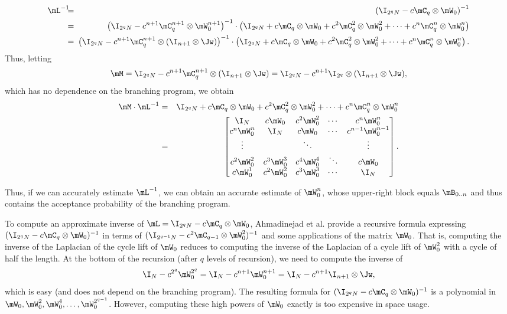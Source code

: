     \begin{eqnarray*}
    \mL^{-1} \!\!\! &=&\!\!\!\! \left(\I_{2^qN} - c \mC_q\otimes \mW_0\right)^{-1}\\
    &=& \!\!\! \left(\I_{2^qN} - c^{n+1} \mC_q^{n+1} \otimes \mW_0^{n+1}\right)^{-1}\cdot
    \left(\I_{2^qN} + c \mC_q\otimes \mW_0 +c^2 \mC^2_q\otimes \mW_0^2 + \cdots +
    c^n \mC^n_q\otimes \mW_0^n\right)\\
    &=& \!\!\! \left(\I_{2^qN} - c^{n+1} \mC_q^{n+1}\otimes(\I_{n+1} \otimes \Jw)\right)^{-1} \cdot 
        \left(\I_{2^qN} + c \mC_q\otimes \mW_0 +c^2 \mC^2_q\otimes \mW_0^2 + \cdots +
    c^n \mC^n_q\otimes \mW_0^n\right).  %
    \end{eqnarray*}
%
    Thus, letting $$\mM = \I_{2^qN} - c^{n+1} \mC_q^{n+1}\otimes(\I_{n+1} \otimes \Jw)= \I_{2^qN} - c^{n+1} \I_{2^q}\otimes(\I_{n+1} \otimes \Jw),$$
    which has no dependence on the branching program,
    we %
    obtain %
    \begin{eqnarray*}
    \mM\cdot \mL^{-1}
    &=& \I_{2^qN} + c \mC_q\otimes \mW_0 +c^2 \mC^2_q\otimes \mW_0^2 + \cdots + 
    c^n \mC^n_q\otimes \mW_0^n\\
    &=&
    \begin{bmatrix}
    \I_N & c\mW_0 & c^2\mW_0^2 & \cdots & c^n\mW_0^n \\
    c^n\mW_0^n & \I_N & c\mW_0 & \cdots & c^{n-1}\mW_0^{n-1} \\
    \vdots & & \ddots & & \vdots\\
    c^2\mW_0^2 & c^3\mW_0^3 & c^4\mW_0^4 & \ddots & c\mW_0\\
    c\mW_0^1 & c^2\mW_0^2 & c^3\mW_0^3 & \cdots &  \I_N \\
    \end{bmatrix}.
    \end{eqnarray*}

    Thus, if we can accurately estimate $\mL^{-1}$, we can
    obtain an accurate estimate of  $\mW_0^n$, whose upper-right block equals $\mB_{0..n}$ and thus contains the acceptance probability of the 
    branching program.
    
    To compute an approximate inverse of $\mL=\I_{2^qN} - c \mC_q \otimes \mW_0$, 
%
Ahmadinejad  %
et al. provide a recursive formula
    expressing $(\I_{2^qN} - c \mC_q \otimes \mW_0)^{-1}$ in terms of
    $(\I_{2^{q-1}N} - c^2 \mC_{q-1} \otimes \mW^2_0)^{-1}$ and some applications of the matrix $\mW_0$.
    That is, computing the inverse of the Laplacian of the cycle lift of $\mW_0$ reduces
    to computing the inverse of the Laplacian of a cycle lift of $\mW_0^2$ with a cycle of half the length.  At the bottom of the recursion (after $q$ levels of recursion), we need to compute the inverse of $$\I_N-c^{2^q}\mW_0^{2^q} = \I_N - c^{n+1}\mW_0^{n+1} = \I_N - c^{n+1} \I_{n+1}\otimes \Jw,$$
    which is easy (and does not depend on the branching program).
    The resulting formula for $(\I_{2^qN} - c \mC_q \otimes \mW_0)^{-1}$
    is a polynomial in $\mW_0,\mW_0^2,\mW_0^4,\ldots,\mW_0^{2^{q-1}}$.
    However, computing these high powers of $\mW_0$ exactly is too expensive in space usage.  
    

